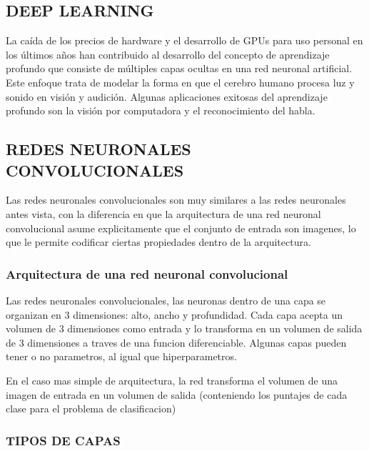 \documentclass[a4paper,10pt]{article}
\begin{document}
  \subsection {DEEP LEARNING}
    La caída de los precios de hardware y el desarrollo de GPUs para uso personal en los últimos años han contribuido al desarrollo del concepto de aprendizaje profundo que consiste
    de múltiples capas ocultas en una red neuronal artificial. Este enfoque trata de modelar la forma en que el cerebro humano procesa luz y sonido en visión y audición.
    Algunas aplicaciones exitosas del aprendizaje profundo son la visión por computadora y el reconocimiento del habla.

  \subsection {REDES NEURONALES CONVOLUCIONALES}
    Las redes neuronales convolucionales son muy similares a las redes neuronales antes vista, con la diferencia en que la arquitectura de una red neuronal convolucional asume explicitamente
    que el conjunto de entrada son imagenes, lo que le permite codificar ciertas propiedades dentro de la arquitectura.

    \subsubsection {Arquitectura de una red neuronal convolucional}
      Las redes neuronales convolucionales, las neuronas dentro de una capa se organizan en 3 dimensiones: alto, ancho y profundidad.
      Cada capa acepta un volumen de 3 dimensiones como entrada y lo transforma en un volumen de salida de 3 dimensiones a traves de una funcion diferenciable.
      Algunas capas pueden tener o no parametros, al igual que hiperparametros.

      En el caso mas simple de arquitectura, la red transforma el volumen de una imagen de entrada en un volumen de salida (conteniendo los puntajes de cada clase para el problema de clasificacion)

    \subsubsection {TIPOS DE CAPAS}
\end{document}
